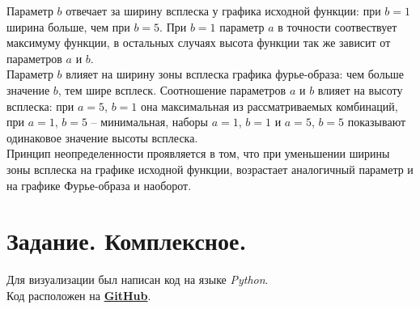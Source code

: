 \documentclass[a5paper, 10pt]{article}
\theoremstyle{definition}
\theoremstyle{plain}
\theoremstyle{remark}
\begin{document}
Параметр $b$ отвечает за ширину всплеска у графика исходной функции: при $b = 1$ ширина больше, чем при $b=5$. При $b=1$ параметр $a$ в точности соотвествует максимуму функции, в остальных случаях высота функции так же зависит от параметров $a$ и $b$.\\

Параметр $b$ влияет на ширину зоны всплеска графика фурье-образа: чем больше значение $b$, тем шире всплеск. Соотношение параметров $a$ и $b$ влияет на высоту всплеска: при $a=5$, $b=1$ она максимальная из рассматриваемых комбинаций, при $a=1$, $b=5$ -- минимальная, наборы $a=1$, $b=1$ и $a=5$, $b=5$ показывают одинаковое значение высоты всплеска.\\

Принцип неопределенности проявляется в том, что при уменьшении ширины зоны всплеска на графике исходной функции, возрастает аналогичный параметр и на графике Фурье-образа и наоборот.\\



\newpage
\section{Задание. Комплексное.}



Для визуализации был написан код на языке \textit{Python}. \\
Код расположен на \href{https://github.com/a-nechaeva/practical_Linal/tree/main/lab4}{\textbf{GitHub}}.
\end{document}
